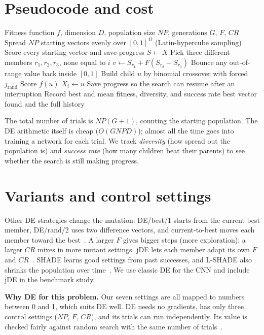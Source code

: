 \section{Pseudocode and cost}
\begin{algorithm}[H]
\caption{DE/rand/1/bin as implemented in this project}
\begin{algorithmic}[1]
\Require Fitness function $f$, dimension $D$, population size $NP$, generations $G$, $F$, $CR$
\State Spread $NP$ starting vectors evenly over $[0,1]^D$ (Latin-hypercube sampling)
\State Score every starting vector and save progress
\State $S\gets X$ 
\State Pick three different members $r_1,r_2,r_3$, none equal to $i$
\State $v\gets S_{r_1}+F(S_{r_2}-S_{r_3})$ 
\State Bounce any out-of-range value back inside $[0,1]$
\State Build child $u$ by binomial crossover with forced $j_{\mathrm{rand}}$
\State Score $f(u)$
\State $X_i\gets u$ \EndIf
\State Save progress so the search can resume after an interruption
\EndFor
\State Record best and mean fitness, diversity, and success rate
\EndFor
\State \Return best vector found and the full history
\end{algorithmic}
\end{algorithm}

The total number of trials is $NP(G+1)$, counting the starting population. The DE arithmetic itself is cheap ($O(GNPD)$); almost all the time goes into training a network for each trial. We track \emph{diversity} (how spread out the population is) and \emph{success rate} (how many children beat their parents) to see whether the search is still making progress.

\section{Variants and control settings}
Other DE strategies change the mutation: DE/best/1 starts from the current best member, DE/rand/2 uses two difference vectors, and current-to-best moves each member toward the best~\cite{das2016recent}. A larger $F$ gives bigger steps (more exploration); a larger $CR$ mixes in more mutant settings. jDE lets each member adapt its own $F$ and $CR$~\cite{brest2006jde}. SHADE learns good settings from past successes, and L-SHADE also shrinks the population over time~\cite{tanabe2013shade,tanabe2014lshade}. We use classic DE for the CNN and include jDE in the benchmark study.

\textbf{Why DE for this problem.} Our seven settings are all mapped to numbers between 0 and 1, which suits DE well. DE needs no gradients, has only three control settings ($NP$, $F$, $CR$), and its trials can run independently. Its value is checked fairly against random search with the same number of trials~\cite{sorensen2015metaphors}.
